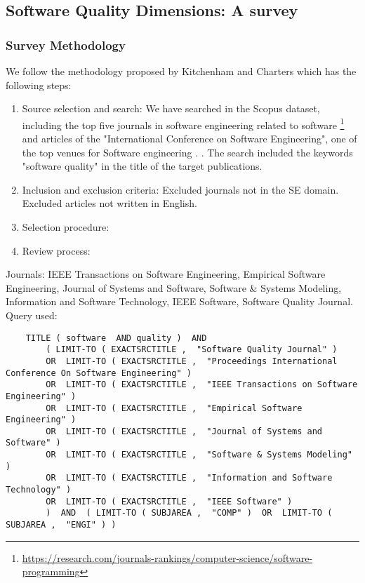 \subsection{Software Quality Dimensions: A survey}


\subsubsection{Survey Methodology}
We follow the methodology proposed by Kitchenham and Charters \cite{kitchenham2007guidelines} which has the following steps:
\begin{enumerate}
    \item Source selection and search: We have searched in the Scopus dataset, including the top five journals in software engineering related to software \footnote{\url{https://research.com/journals-rankings/computer-science/software-programming}} and articles of the  "International Conference on Software Engineering", one of the top venues for Software engineering . . The search included the keywords "software quality" in the title of the target publications. 
    \item Inclusion and exclusion criteria: Excluded journals not in the SE domain. Excluded articles not written in English.
    \item Selection procedure: 
    \item Review process: 
\end{enumerate}

Journals: IEEE Transactions on Software Engineering, Empirical Software Engineering, Journal of Systems and Software, Software \& Systems Modeling,  Information and Software Technology, IEEE Software, Software Quality Journal. Query used:

\tiny
\begin{verbatim}
    TITLE ( software  AND quality )  AND  
        ( LIMIT-TO ( EXACTSRCTITLE ,  "Software Quality Journal" )  
        OR  LIMIT-TO ( EXACTSRCTITLE ,  "Proceedings International Conference On Software Engineering" ) 
        OR  LIMIT-TO ( EXACTSRCTITLE ,  "IEEE Transactions on Software Engineering" )
        OR  LIMIT-TO ( EXACTSRCTITLE ,  "Empirical Software Engineering" ) 
        OR  LIMIT-TO ( EXACTSRCTITLE ,  "Journal of Systems and Software" ) 
        OR  LIMIT-TO ( EXACTSRCTITLE ,  "Software & Systems Modeling" ) 
        OR  LIMIT-TO ( EXACTSRCTITLE ,  "Information and Software Technology" )  
        OR  LIMIT-TO ( EXACTSRCTITLE ,  "IEEE Software" )   
        )  AND  ( LIMIT-TO ( SUBJAREA ,  "COMP" )  OR  LIMIT-TO ( SUBJAREA ,  "ENGI" ) )  
\end{verbatim}
\small

